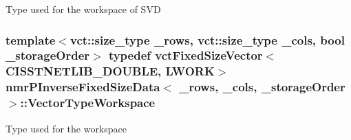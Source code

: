 Type used for the workspace of S\-V\-D \hypertarget{classnmr_p_inverse_fixed_size_data_a801f15c74e8a0884df8cbee5fe0ed052}{
\subsubsection[{Vector\-Type\-Workspace}]{\setlength{\rightskip}{0pt plus 5cm}template$<$vct\-::size\-\_\-type \-\_\-rows, vct\-::size\-\_\-type \-\_\-cols, bool \-\_\-storage\-Order$>$ typedef {\bf vct\-Fixed\-Size\-Vector}$<$C\-I\-S\-S\-T\-N\-E\-T\-L\-I\-B\-\_\-\-D\-O\-U\-B\-L\-E, {\bf L\-W\-O\-R\-K}$>$ {\bf nmr\-P\-Inverse\-Fixed\-Size\-Data}$<$ \-\_\-rows, \-\_\-cols, \-\_\-storage\-Order $>$\-::{\bf Vector\-Type\-Workspace}}}\label{classnmr_p_inverse_fixed_size_data_a801f15c74e8a0884df8cbee5fe0ed052}
Type used for the workspace 

